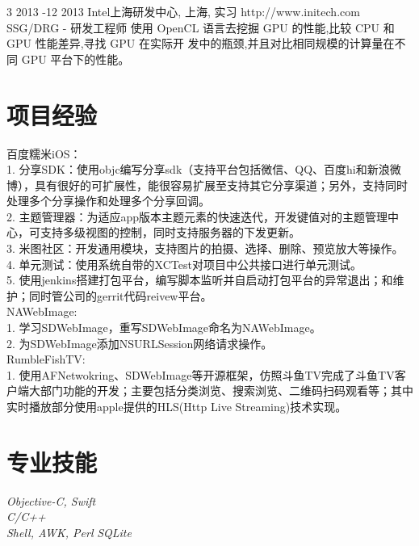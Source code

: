\documentclass[10pt]{article} %
\begin{document}
\job
{3 2013 -}{12 2013}
{Intel上海研发中心, 上海, 实习}
{http://www.initech.com}
{SSG/DRG - 研发工程师}
{ 使用 OpenCL 语言去挖掘 GPU 的性能,比较 CPU 和 GPU 性能差异,寻找 GPU 在实际开 发中的瓶颈,并且对比相同规模的计算量在不同 GPU 平台下的性能。}

\section{项目经验}

百度糯米iOS：\\
1. 分享SDK：使用objc编写分享sdk（支持平台包括微信、QQ、百度hi和新浪微博），具有很好的可扩展性，能很容易扩展至支持其它分享渠道；另外，支持同时处理多个分享操作和处理多个分享回调。\\
2. 主题管理器：为适应app版本主题元素的快速迭代，开发键值对的主题管理中心，可支持多级视图的控制，同时支持服务器的下发更新。\\
3. 米图社区：开发通用模块，支持图片的拍摄、选择、删除、预览放大等操作。\\
4. 单元测试：使用系统自带的XCTest对项目中公共接口进行单元测试。\\
5. 使用jenkins搭建打包平台，编写脚本监听并自启动打包平台的异常退出；和维护；同时管公司的gerrit代码reivew平台。\\

NAWebImage: \\
1. 学习SDWebImage，重写SDWebImage命名为NAWebImage。\\
2. 为SDWebImage添加NSURLSession网络请求操作。\\


RumbleFishTV:\\
1. 使用AFNetwokring、SDWebImage等开源框架，仿照斗鱼TV完成了斗鱼TV客户端大部门功能的开发；主要包括分类浏览、搜索浏览、二维码扫码观看等；其中实时播放部分使用apple提供的HLS(Http Live Streaming)技术实现。\\


\section{专业技能}

{
\textit{Objective-C, Swift}\\
\textit{C/C++}\\
\textit{Shell, AWK, Perl}
\textit{SQLite}
}
\end{document}
